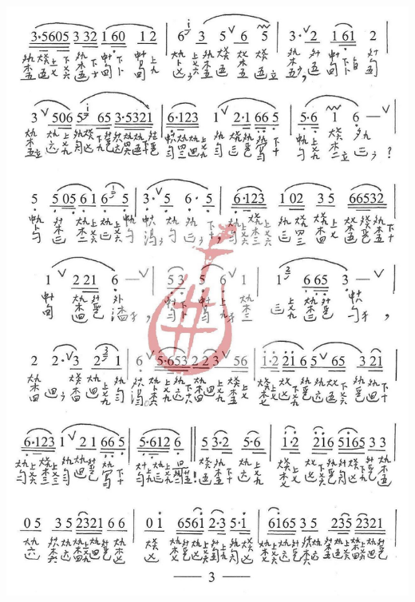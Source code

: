 \documentclass[cn,pad,twocol]{elegantbook}
\begin{document}
\paragraph*{\includegraphics[width=\textwidth]{mudanting/2021-牡丹亭-03游园}} 
\end{document}
